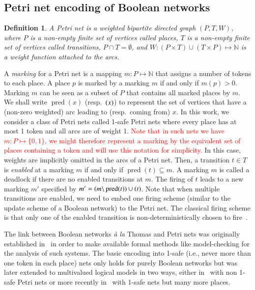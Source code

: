 \documentclass[preprint,12pt]{elsarticle}
\newtheorem{definition}{Definition}[section]
\newcommand{\change}[1]{\textcolor{red}{#1}}
\DeclareMathOperator{\pred}{pred}
\let\succ\relax
\DeclareMathOperator{\succ}{succ}
\begin{document}
\subsection{Petri net encoding of Boolean networks}%
\label{sec:encoding}

\begin{definition}

  A \emph{Petri net} is a weighted bipartite directed graph \((P, T, W)\),
  where \(P\) is a non-empty finite set of vertices called \emph{places},
  \(T\) is a non-empty finite set of vertices called \emph{transitions},
  \(P \cap T = \emptyset\),
  and \(W : (P \times T) \cup (T \times P) \mapsto \mathbb{N} \) is a weight function attached to the arcs.

\end{definition}
A \emph{marking} for a Petri net is a mapping \(m : P \mapsto \mathbb{N}\) that assigns a number of tokens to each place.
A place \(p\) is marked by a marking \(m\) if and only if \(m(p) > 0\).
Marking \(m\) can be seen as a subset of \(P\) that contains all marked places by \(m\).
We shall write \(\pred(x)\) (resp.\ \(\succ(x)\)) to represent the set of vertices that have a (non-zero weighted) arc leading to (resp.\ coming from) \(x\).
In this work, we consider a class of Petri nets called 1-safe Petri nets where every place has at most 1 token and all arcs are of weight 1.
\change{Note that in such nets we have \(m : P \mapsto \{0,1\}\), we might therefore represent a marking by the equivalent set of places containing a token and will use this notation for simplicity.}
In this case, weights are implicitly omitted in the arcs of a Petri net.
Then, a transition \(t \in T\) is \emph{enabled} at a marking \(m\) if and only if \(\pred(t) \subseteq m\).
A marking \(m\) is called a deadlock if there are no enabled transitions at \(m\).
The firing of \(t\) leads to a new marking \(m'\) specified by \(m' = (m \backslash \pred(t)) \cup \succ(t)\).
Note that when multiple transitions are enabled, we need to embed one firing scheme (similar to the update scheme of a Boolean network) to the Petri net.
The classical firing scheme is that only one of the enabled transition is non-deterministically chosen to fire~\cite{Murata1989}.

The link between Boolean networks \emph{à la} Thomas and Petri nets was originally established in~\cite{chaouiya2004qualitative} in order to make available formal methods like model-checking for the analysis of such systems.
The basic encoding into 1-safe (i.e., never more than one token in each place) nets only holds for purely Boolean networks but was later extended to multivalued logical models in two ways, either in~\cite{chaouiya2011petri} with non 1-safe Petri nets or more recently in~\cite{chatain2014characterization} with 1-safe nets but many more places.
\end{document}
